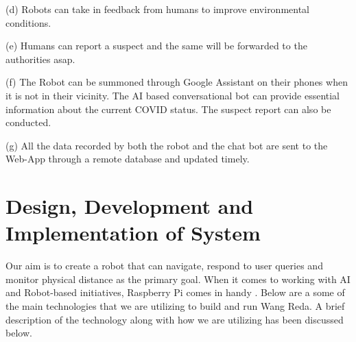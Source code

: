 \documentclass[AMA,STIX1COL]{WileyNJD-v2}
\begin{document}
(d) Robots can take in feedback from humans to improve environmental conditions.

(e) Humans can report a suspect and the same will be forwarded to the authorities asap.

(f) The Robot can be summoned through Google Assistant on their phones when it is not in their vicinity. The AI based conversational bot can provide essential information about the current COVID status. The suspect report can also be conducted.

(g) All the data recorded by both the robot and the chat bot are sent to the Web-App through a remote database and updated timely.

\section{Design, Development and Implementation of System}

Our aim is to create a robot that can navigate, respond to user queries and monitor physical distance as the primary goal. When it comes to working with AI and Robot-based initiatives, Raspberry Pi comes in handy \cite{b12}. Below are a some of the main technologies that we are utilizing to build and run Wang Reda. A brief description of the technology along with how we are utilizing has been discussed below.






\end{document}
